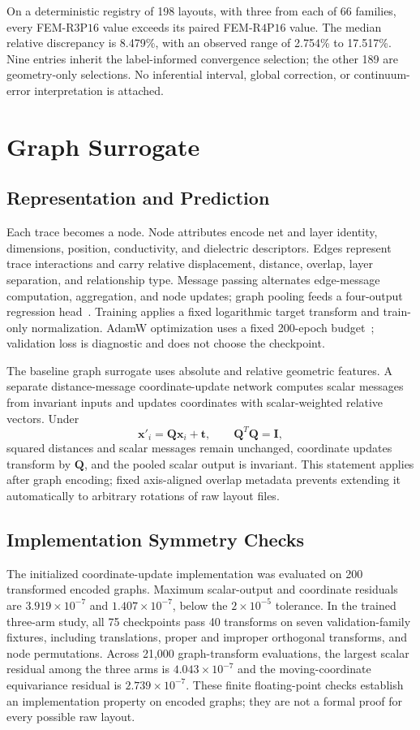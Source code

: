 \documentclass[journal]{IEEEtran}
\newcommand{\Rthree}{\mathrm{R3P16}}
\newcommand{\Rfour}{\mathrm{R4P16}}
\begin{document}
On a deterministic registry of 198 layouts, with three from each of 66 families, every FEM-$\Rthree$ value exceeds its paired FEM-$\Rfour$ value. The median relative discrepancy is 8.479\%, with an observed range of 2.754\% to 17.517\%. Nine entries inherit the label-informed convergence selection; the other 189 are geometry-only selections. No inferential interval, global correction, or continuum-error interpretation is attached.

\section{Graph Surrogate}
\subsection{Representation and Prediction}
Each trace becomes a node. Node attributes encode net and layer identity, dimensions, position, conductivity, and dielectric descriptors. Edges represent trace interactions and carry relative displacement, distance, overlap, layer separation, and relationship type. Message passing alternates edge-message computation, aggregation, and node updates; graph pooling feeds a four-output regression head~\cite{gilmer}. Training applies a fixed logarithmic target transform and train-only normalization. AdamW optimization uses a fixed 200-epoch budget~\cite{adamw}; validation loss is diagnostic and does not choose the checkpoint.

The baseline graph surrogate uses absolute and relative geometric features. A separate distance-message coordinate-update network computes scalar messages from invariant inputs and updates coordinates with scalar-weighted relative vectors. Under
\begin{equation}
\mathbf{x}'_i=\mathbf{Q}\mathbf{x}_i+\mathbf{t},\qquad \mathbf{Q}^{T}\mathbf{Q}=\mathbf{I},
\end{equation}
squared distances and scalar messages remain unchanged, coordinate updates transform by $\mathbf{Q}$, and the pooled scalar output is invariant. This statement applies after graph encoding; fixed axis-aligned overlap metadata prevents extending it automatically to arbitrary rotations of raw layout files.

\subsection{Implementation Symmetry Checks}
The initialized coordinate-update implementation was evaluated on 200 transformed encoded graphs. Maximum scalar-output and coordinate residuals are $3.919\times10^{-7}$ and $1.407\times10^{-7}$, below the $2\times10^{-5}$ tolerance. In the trained three-arm study, all 75 checkpoints pass 40 transforms on seven validation-family fixtures, including translations, proper and improper orthogonal transforms, and node permutations. Across 21,000 graph-transform evaluations, the largest scalar residual among the three arms is $4.043\times10^{-7}$ and the moving-coordinate equivariance residual is $2.739\times10^{-7}$. These finite floating-point checks establish an implementation property on encoded graphs; they are not a formal proof for every possible raw layout.
\end{document}
